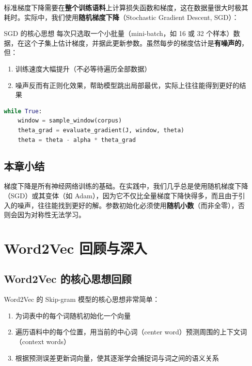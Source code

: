 \documentclass[a4paper]{article}
\begin{document}
标准梯度下降需要在\textbf{整个训练语料}上计算损失函数和梯度，这在数据量很大时极其耗时。实际中，我们使用\textbf{随机梯度下降}（Stochastic Gradient Descent, SGD）：





\begin{importantbox}{SGD 的核心思想}
每次只选取一个小批量（mini-batch，如 16 或 32 个样本）数据，在这个子集上估计梯度，并据此更新参数。虽然每步的梯度估计是\textbf{有噪声的}，但：
\begin{enumerate}
    \item 训练速度大幅提升（不必等待遍历全部数据）
    \item 噪声反而有正则化效果，帮助模型跳出局部最优，实际上往往能得到更好的结果
\end{enumerate}
\end{importantbox}

\begin{lstlisting}[caption={随机梯度下降伪代码},language=Python]
while True:
    window = sample_window(corpus)
    theta_grad = evaluate_gradient(J, window, theta)
    theta = theta - alpha * theta_grad
\end{lstlisting}

\subsection{本章小结}

梯度下降是所有神经网络训练的基础。在实践中，我们几乎总是使用随机梯度下降（SGD）或其变体（如 Adam），因为它不仅比全量梯度下降快得多，而且由于引入的噪声，往往能找到更好的解。参数初始化必须使用\textbf{随机小数}（而非全零），否则会因为对称性无法学习。


\section{Word2Vec 回顾与深入}

\subsection{Word2Vec 的核心思想回顾}

Word2Vec 的 Skip-gram 模型的核心思想非常简单：

\begin{enumerate}
    \item 为词表中的每个词随机初始化一个向量
    \item 遍历语料中的每个位置，用当前的中心词（center word）预测周围的上下文词（context words）
    \item 根据预测误差更新词向量，使其逐渐学会捕捉词与词之间的语义关系
\end{enumerate}
\end{document}
